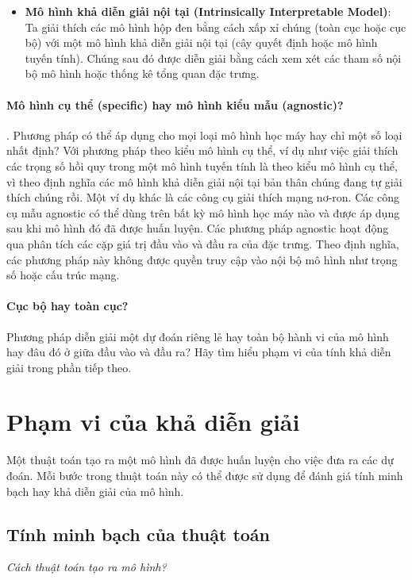 \begin{itemize}
\item \textbf{Mô hình khả diễn giải nội tại (Intrinsically Interpretable Model)}: Ta giải thích các mô hình hộp đen bằng cách xấp xỉ chúng (toàn cục hoặc cục bộ) với một mô hình khả diễn giải nội tại (cây quyết định hoặc mô hình tuyến tính). Chúng sau đó được diễn giải bằng cách xem xét các tham số nội bộ mô hình hoặc thống kê tổng quan đặc trưng.

\end{itemize}

\paragraph{Mô hình cụ thể (specific) hay mô hình kiểu mẫu (agnostic)?}. Phương pháp có thể áp dụng cho mọi loại mô hình học máy hay chỉ một số loại nhất định? Với phương pháp theo kiểu mô hình cụ thể, ví dụ như việc giải thích các trọng số hồi quy trong một mô hình tuyến tính là theo kiểu mô hình cụ thể,  vì theo định nghĩa các mô hình khả diễn giải nội tại bản thân chúng đang tự giải thích chúng rồi. Một ví dụ khác là các công cụ giải thích mạng nơ-ron. Các công cụ mẫu agnostic có thể dùng trên bất kỳ mô hình học máy nào và được áp dụng sau khi mô hình đó đã được huấn luyện. Các phương pháp agnostic hoạt động qua phân tích các cặp giá trị đầu vào và đầu ra của đặc trưng. Theo định nghĩa, các phương pháp này không được quyền truy cập vào nội bộ mô hình như trọng số hoặc cấu trúc mạng.

\paragraph{Cục bộ hay toàn cục?} Phương pháp diễn giải một dự đoán riêng lẻ hay toàn bộ hành vi của mô hình hay đâu đó ở giữa đầu vào và đầu ra? Hãy tìm hiểu phạm vi của tính khả diễn giải trong phần tiếp theo.

\clearpage 

\section{Phạm vi của khả diễn giải}
Một thuật toán tạo ra một mô hình đã được huấn luyện cho việc đưa ra các dự đoán. Mỗi bước trong thuật toán này có thể được sử dụng để đánh giá tính minh bạch hay khả diễn giải của mô hình.
\subsection{Tính minh bạch của thuật toán}
\textit{Cách thuật toán tạo ra mô hình?}

